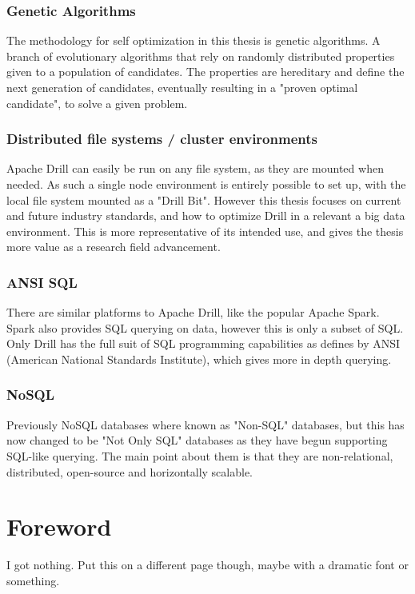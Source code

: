 \documentclass[a4paper,english]{report}
\begin{document}
			\subsubsection{Genetic Algorithms}
			The methodology for self optimization in this thesis is genetic algorithms. A branch of evolutionary algorithms that rely on randomly distributed properties given to a population of candidates. The properties are hereditary and define the next generation of candidates, eventually resulting in a "proven optimal candidate", to solve a given problem.
			\subsubsection{Distributed file systems / cluster environments}
			Apache Drill can easily be run on any file system, as they are mounted when needed. As such a single node environment is entirely possible to set up, with the local file system mounted as a "Drill Bit". However this thesis focuses on current and future industry standards, and how to optimize Drill in a relevant a big data environment. This is more representative of its intended use, and gives the thesis more value as a research field advancement.
			\subsubsection{ANSI SQL}
			There are similar platforms to Apache Drill, like the popular Apache Spark. Spark also provides SQL querying on data, however this is only a subset of SQL. Only Drill has the full suit of SQL programming capabilities as defines by ANSI (American National Standards Institute), which gives more in depth querying.
			\subsubsection{NoSQL}
			Previously NoSQL databases where known as "Non-SQL" databases, but this has now changed to be "Not Only SQL" databases as they have begun supporting SQL-like querying. The main point about them is that they are non-relational, distributed, open-source and horizontally scalable.\cite{no_sql}
	\pagebreak
	\section{Foreword}
	I got nothing. Put this on a different page though, maybe with a dramatic font or something.
	
	\tableofcontents
	
\end{document}
